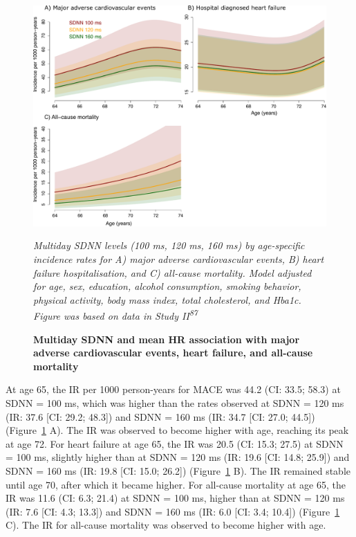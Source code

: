 \documentclass[
  letterpaper,
  headsepline=true,
  open=any]{scrbook}
\begin{document}
\begin{figure}

{\centering 

\includegraphics{images/addition_pro_hrv_ir_mace.pdf}

\emph{Multiday SDNN levels (100 ms, 120 ms, 160 ms) by age-specific
incidence rates for A) major adverse cardiovascular events, B) heart
failure hospitalisation, and C) all-cause mortality. Model adjusted for
age, sex, education, alcohol consumption, smoking behavior, physical
activity, body mass index, total cholesterol, and Hba1c. Figure was
based on data in Study II\textsuperscript{87}}

}

\caption{\label{fig-addprohrv}\textbf{Multiday SDNN and mean HR
association with major adverse cardiovascular events, heart failure, and
all-cause mortality}}

\end{figure}

\restoregeometry

At age 65, the IR per 1000 person-years for MACE was 44.2 (CI: 33.5;
58.3) at SDNN = 100 ms, which was higher than the rates observed at SDNN
= 120 ms (IR: 37.6 {[}CI: 29.2; 48.3{]}) and SDNN = 160 ms (IR: 34.7
{[}CI: 27.0; 44.5{]}) (Figure~\ref{fig-addprohrv} A). The IR was
observed to become higher with age, reaching its peak at age 72. For
heart failure at age 65, the IR was 20.5 (CI: 15.3; 27.5) at SDNN = 100
ms, slightly higher than at SDNN = 120 ms (IR: 19.6 {[}CI: 14.8;
25.9{]}) and SDNN = 160 ms (IR: 19.8 {[}CI: 15.0; 26.2{]})
(Figure~\ref{fig-addprohrv} B). The IR remained stable until age 70,
after which it became higher. For all-cause mortality at age 65, the IR
was 11.6 (CI: 6.3; 21.4) at SDNN = 100 ms, higher than at SDNN = 120 ms
(IR: 7.6 {[}CI: 4.3; 13.3{]}) and SDNN = 160 ms (IR: 6.0 {[}CI: 3.4;
10.4{]}) (Figure~\ref{fig-addprohrv} C). The IR for all-cause mortality
was observed to become higher with age.
\end{document}
